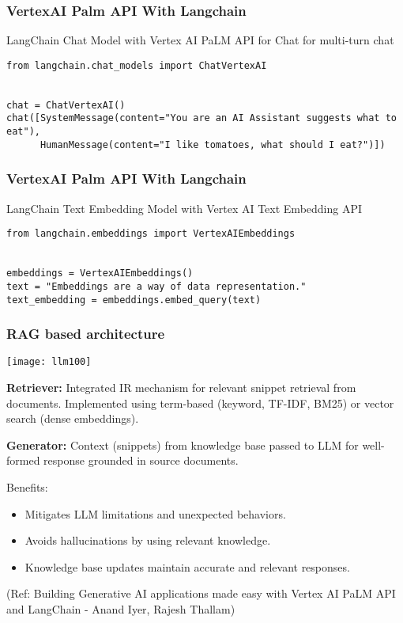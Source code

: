 \begin{frame}[fragile]\frametitle{VertexAI Palm API With Langchain}

LangChain Chat Model with Vertex AI PaLM API for Chat for multi-turn chat

\begin{lstlisting}
from langchain.chat_models import ChatVertexAI


chat = ChatVertexAI()
chat([SystemMessage(content="You are an AI Assistant suggests what to eat"),
      HumanMessage(content="I like tomatoes, what should I eat?")])
\end{lstlisting}

\end{frame}

\begin{frame}[fragile]\frametitle{VertexAI Palm API With Langchain}

LangChain Text Embedding Model with Vertex AI Text Embedding API

\begin{lstlisting}
from langchain.embeddings import VertexAIEmbeddings


embeddings = VertexAIEmbeddings()
text = "Embeddings are a way of data representation."
text_embedding = embeddings.embed_query(text)
\end{lstlisting}

\end{frame}

\begin{frame}[fragile]\frametitle{ RAG based architecture}

\begin{center}
\texttt{[image: llm100]}
\end{center}

\textbf{Retriever:} Integrated IR mechanism for relevant snippet retrieval from documents. Implemented using term-based (keyword, TF-IDF, BM25) or vector search (dense embeddings).

\textbf{Generator:} Context (snippets) from knowledge base passed to LLM for well-formed response grounded in source documents.

Benefits:
\begin{itemize}
    \item Mitigates LLM limitations and unexpected behaviors.
    \item Avoids hallucinations by using relevant knowledge.
    \item Knowledge base updates maintain accurate and relevant responses.
\end{itemize}


{\tiny (Ref: Building Generative AI applications made easy with Vertex AI PaLM API and LangChain  - Anand Iyer, Rajesh Thallam)}


\end{frame}


